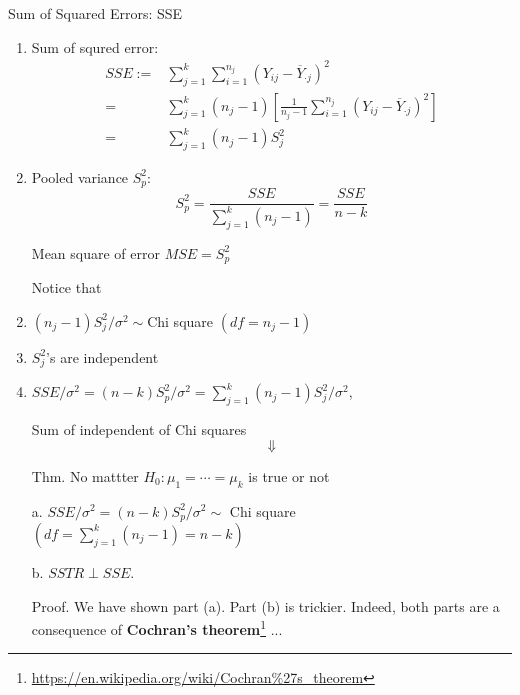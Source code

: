 \begin{frame}[fragile]{Sum of Squared Errors: SSE}

	\begin{enumerate}
		\item Sum of squred error:
			\vfill
	\begin{align*}
		SSE:=& \sum_{j=1}^k\sum_{i=1}^{n_j} \left(Y_{ij}-\overline{Y}_{\cdot j} \right)^2\\[1em]
		=& \sum_{j=1}^k(n_j-1)\left[ \frac{1}{n_j-1} \sum_{i=1}^{n_j} \left(Y_{ij}-\overline{Y}_{\cdot j} \right)^2\right]\\[1em]
		=&\sum_{j=1}^k(n_j-1) S_j^2
	\end{align*}
	\vfill
	\item Pooled variance $S_p^2$:
		\vfill
	\[
		S_p^2 = \frac{SSE}{\sum_{j=1}^k (n_j-1)} = \frac{SSE}{n-k}
	\]
\item[] Mean square of error $MSE = S_p^2$
	\end{enumerate}
\end{frame}
\begin{frame}[fragile]


\begin{enumerate}
	\item[] Notice that\\[1em]
	\item $(n_j-1)S_j^2/\sigma^2\sim $Chi square $(df=n_j-1)$
	\item $S_j^2$'s are independent
	\item $SSE/\sigma^2 = (n-k) S_p^2/\sigma^2= \sum_{j=1}^k (n_j-1)S_j^2/\sigma^2 $,
	\item[] \qquad\qquad Sum of independent of Chi squares
		\[\Downarrow\]
	\item[Thm.] No mattter $H_0:\mu_1=\cdots=\mu_k$ is true or not
	\item[a.] $SSE/\sigma^2 = (n-k) S_p^2/\sigma^2\sim$ Chi square $(df=\sum_{j=1}^k(n_j-1) = n-k)$
	\item[b.] $SSTR \perp SSE$.
		\vfill
	\item[Proof.] We have shown part (a). Part (b) is trickier. Indeed, both parts are a consequence of \textcolor{yellow!80!black}{\bf Cochran's theorem}\footnote{\url{https://en.wikipedia.org/wiki/Cochran\%27s_theorem}} ... \myEnd
\end{enumerate}

\end{frame}
